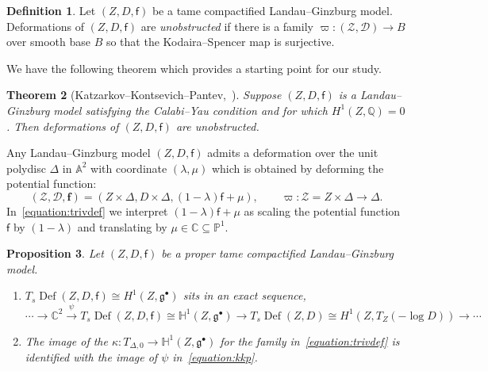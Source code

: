 \documentclass[10pt]{amsart}
\numberwithin{equation}{section}
\theoremstyle{plain}
\newtheorem{theorem}{Theorem}[section]
\newtheorem{proposition}[theorem]{Proposition}
\theoremstyle{definition}
\newtheorem{definition}[theorem]{Definition}
\theoremstyle{remark}
\DeclareMathOperator{\Def}{Def}
\begin{document}
\begin{definition}
  Let \((Z,D,\mathsf{f})\) be a tame compactified Landau--Ginzburg model. Deformations of \((Z,D,\mathsf{f})\) are \emph{unobstructed} if there is a family \(\varpi: (\mathscr{Z},\mathscr{D})\rightarrow B\) over smooth base \(B\) so that the Kodaira--Spencer map is surjective.
\end{definition}

We have the following theorem which provides a starting point for our study.

\begin{theorem}[Katzarkov--Kontsevich--Pantev,~\cite{katzarkov2017bogomolov}]\label{theorem:kkp}
  Suppose \((Z,D,\mathsf{f})\) is a Landau--Ginzburg model satisfying the Calabi--Yau condition and for which \(H^1(Z,\mathbb{Q}) = 0\). Then deformations of \((Z,D,\mathsf{f})\) are unobstructed.
\end{theorem}

Any Landau--Ginzburg model \((Z,D,\mathsf{f})\) admits a deformation over the unit polydisc \(\Delta\) in \(\mathbb{A}^2\) with coordinate \((\lambda,\mu)\) which is obtained by deforming the potential function:
\begin{equation}\label{equation:trivdef}
  (\mathscr{Z},\mathscr{D},\bm{f}) = (Z\times \Delta, D\times \Delta, (1-\lambda)\mathsf{f} + \mu),\qquad \varpi \colon \mathscr{Z} = Z\times \Delta \rightarrow \Delta.
\end{equation}
In~\eqref{equation:trivdef} we interpret \((1 - \lambda)\mathsf{f} + \mu\) as scaling the potential function \(\mathsf{f}\) by \((1 - \lambda)\) and translating by \(\mu \in \mathbb{C} \subseteq \mathbb{P}^1\).

\begin{proposition}
  Let \((Z,D,\mathsf{f})\) be a proper tame compactified Landau--Ginzburg model.
  \begin{enumerate}
  \item \(T_s \Def(Z,D,\mathsf{f}) \cong H^1(Z,\mathfrak{g}^\bullet)\) sits in an exact sequence,
    \begin{equation}\label{equation:kkp}
      \cdots \rightarrow \mathbb{C}^2 \xrightarrow{\psi} T_s \Def(Z,D,\mathsf{f}) \cong \mathbb{H}^1(Z,\mathfrak{g}^\bullet) \rightarrow T_s \Def(Z,D)\cong H^1(Z,T_Z(-\log D))\rightarrow  \cdots
    \end{equation}
  \item The image of the \(\kappa \colon T_{\Delta,0} \rightarrow \mathbb{H}^1(Z,\mathfrak{g}^\bullet)\) for the family in~\eqref{equation:trivdef} is identified with the image of \(\psi\) in~\eqref{equation:kkp}.
  \end{enumerate}
\end{proposition}
\end{document}
